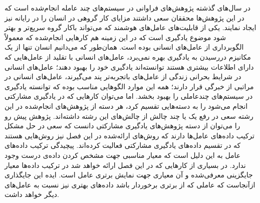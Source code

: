 در سال‌های گذشته پژوهش‌های فراوانی در سیستم‌های چند عامله انجام‌شده است که در این پژوهش‌ها محققان سعی داشتند مزایای کار گروهی در انسان را در رایانه نیز ایجاد نمایند. یکی از قابلیت‌های عامل‌های هوشمند که می‌تواند باکار گروه سریع‌تر و بهتر شود موضوع یادگیری است که در این زمینه هم کارهایی انجام‌شده که معمولاً الگوبرداری از عامل‌های انسانی بوده است. همان‌طور که می‌دانیم انسان تنها از یک مکانیزم دررسیدن به یادگیری بهره نمی‌برد، عامل‌های انسانی با تقلید از عامل‌هایی که دارای اطلاعات بیشتری هستند توانسته‌اند یادگیری خود را بهبود دهند؛ عامل‌های انسانی در شرایط بحرانی زندگی از عامل‌های باتجربه‌تر پند می‌گیرند، عامل‌های انسانی در مراتبی از خبرگی قرار دارند؛ همه این موارد الگوهایی مناسب بوده که توانسته یادگیری در سیستم‌های چندعاملی را بهبود بخشد.
اما می‌توان کارهایی که در یادگیری مشارکتی انجام می‌شود را به دسته‌هایی تقسیم کرد، هر دسته از پژوهش‌های انجام‌شده در این رشته سعی در رفع یک یا چند چالش از چالش‌های این رشته داشته‌اند. پژوهش پیش رو را می‌توان از دسته پژوهش‌های یادگیری مشارکتی دانست که سعی در حل مشکل ترکیب داده‌های عامل‌ها دارند که روش‌های ارائه‌شده در این فصل نیز روش‌هایی هستند که در تقسیم داده‌های یادگیری مشارکتی فعالیت کرده‌اند.
پیچیدگی ترکیب داده‌های عامل به این دلیل است که معیار مناسبی جهت مشخص کردن داده‌ی درست وجود ندارد. در بسیاری از کارهایی که در این فصل ارائه خواهد شد در ترکیب داده‌ها معیار جایگزینی معرفی‌شده و آن معیاری جهت نمایش برتری عامل است. ایده این جایگذاری ازآنجاست که عاملی که از برتری برخوردار باشد داده‌های بهتری نیز نسبت به عامل‌های دیگر خواهد داشت.